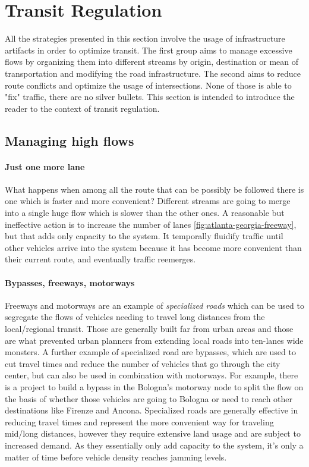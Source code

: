 \section{Transit Regulation}

All the strategies presented in this section involve the usage of infrastructure artifacts in order to optimize transit. The first group aims to manage excessive flows by organizing them into different streams by origin, destination or mean of transportation and modifying the road infrastructure. The second aims to reduce route conflicts and optimize the usage of intersections. None of those is able to "fix" traffic, there are no silver bullets. This section is intended to introduce the reader to the context of transit regulation.

\subsection{Managing high flows}

\paragraph{Just one more lane}

What happens when among all the route that can be possibly be followed there is one which is faster and more convenient? Different streams are going to merge into a single huge flow which is slower than the other ones. A reasonable but ineffective action is to increase the number of lanes \ref{fig:atlanta-georgia-freeway}, but that adds only capacity to the system. It temporally fluidify traffic until other vehicles arrive into the system because it has become more convenient than their current route, and eventually traffic reemerges.

\paragraph{Bypasses, freeways, motorways}

Freeways and motorways are an example of \textit{specialized roads} which can be used to segregate the flows of vehicles needing to travel long distances from the local/regional transit. Those are generally built far from urban areas and those are what prevented urban planners from extending local roads into ten-lanes wide monsters. A further example of specialized road are bypasses, which are used to cut travel times and reduce the number of vehicles that go through the city center, but can also be used in combination with motorways. For example, there is a project to build a bypass in the Bologna's motorway node to split the flow on the basis of whether those vehicles are going to Bologna or need to reach other destinations like Firenze and Ancona. Specialized roads are generally effective in reducing travel times and represent the more convenient way for traveling mid/long distances, however they require extensive land usage and are subject to increased demand. As they essentially only add capacity to the system, it's only a matter of time before vehicle density reaches jamming levels.


